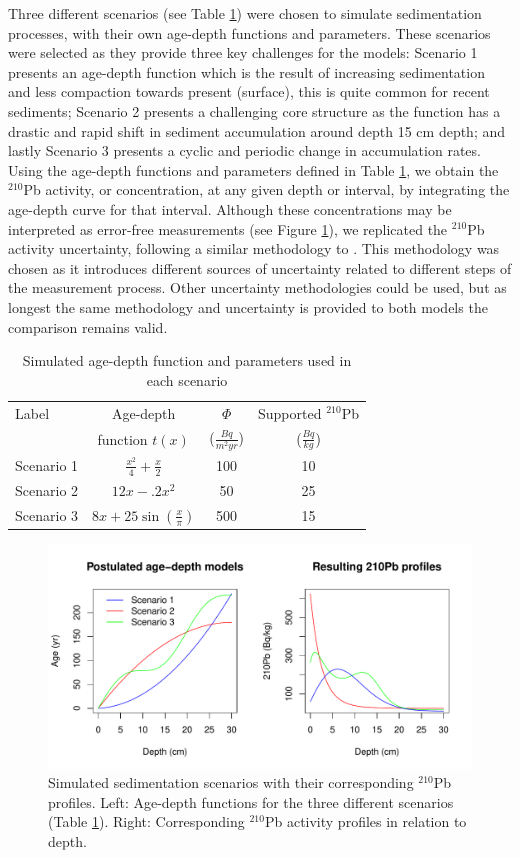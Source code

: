 \documentclass [10pt] {article}
\begin{document}
Three different scenarios (see Table \ref{tab:sim_param}) were chosen to simulate sedimentation processes, with their own age-depth functions and parameters. 
These scenarios were selected as they provide three key challenges for the models: Scenario 1 presents an age-depth function which is the result of increasing sedimentation and less compaction towards present (surface), this is quite common for recent sediments; Scenario 2 presents a challenging core structure as the function has a drastic and rapid shift in sediment accumulation around depth 15 cm depth; and lastly Scenario 3 presents a cyclic and periodic change in accumulation rates. 
Using the age-depth functions and parameters defined in Table \ref{tab:sim_param}, we obtain the $^{210}$Pb activity, or concentration, at any given depth or interval, by integrating the age-depth curve for that interval.  
Although these concentrations may be interpreted as error-free measurements 
(see Figure \ref{fig:true_210}), we replicated the $^{210}$Pb activity uncertainty, following a similar methodology to \citet{Blaauw2018}.
This methodology was chosen as it introduces different sources of uncertainty related to different steps of the measurement process.
Other uncertainty methodologies could be used, but as longest the same methodology and uncertainty is provided to both models the comparison remains valid.
\begin{table}[!h]
	\centering
	\begin{tabular}{l|ccc}
Label    	& 	Age-depth		&	$ \Phi$		& Supported $^{210}$Pb  \\
		&	function $t(x)$		&	($\frac{Bq}{m^2yr }$)	& ($\frac{Bq}{kg}$) 	\\ \hline
Scenario 1 	&	$\frac{x^2}{4} + \frac{x}{2}$	&	100	& 10	\\
Scenario 2 	&	$12x -.2x^2$			&	50	& 25	\\
Scenario 3 	&	$8x+25\sin(\frac{x}{\pi})$	&	500 	& 15		
	\end{tabular}
	\label{tab:sim_param}
	\caption{Simulated age-depth function and parameters used in each scenario}
 \end{table}

\begin{figure}[!h]
 \centering
  \includegraphics[width=.95\linewidth]{chronology.pdf}
	\caption{Simulated sedimentation scenarios with their corresponding $^{210}$Pb profiles. Left: Age-depth functions for the three different scenarios (Table \ref{tab:sim_param}). Right: Corresponding $^{210}$Pb activity profiles in relation to depth.}
  \label{fig:true_210}
\end{figure}
\end{document}
